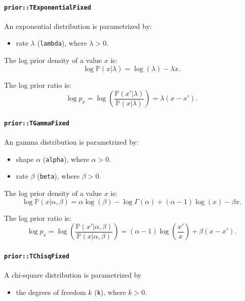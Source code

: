 \documentclass[a4paper,11pt]{article}
\def\p{\mathbb{P}}
\newcommand{\class}[1]{\texttt{#1}}
\newcommand{\privparam}[1]{\texttt{\textunderscore #1}}
\begin{document}
\paragraph{\class{prior::TExponentialFixed}}
An exponential distribution is parametrized by:
\begin{itemize}
 \item rate $\lambda$ (\privparam{lambda}), where $\lambda > 0$.
\end{itemize}

The log prior density of a value $x$ is:
\begin{equation}\label{eq:priorDensExponential}
 \log \p(x|\lambda) = \log(\lambda) - \lambda x.
\end{equation}

The log prior ratio is:
\begin{equation}\label{eq:priorRatioExponential}
 \log p_x = \log \left( \frac{\p(x'|\lambda)}{\p(x|\lambda)} \right) = \lambda (x - x').
\end{equation}

\paragraph{\class{prior::TGammaFixed}}
An gamma distribution is parametrized by:
\begin{itemize}
 \item shape $\alpha$ (\privparam{alpha}), where $\alpha > 0$.
 \item rate $\beta$ (\privparam{beta}), where $\beta > 0$.
\end{itemize}

The log prior density of a value $x$ is:
\begin{equation}\label{eq:priorDensGamma}
 \log \p(x|\alpha, \beta) = \alpha \log(\beta) - \log\Gamma(\alpha) + (\alpha - 1) \log(x) - \beta x.
\end{equation}

The log prior ratio is:
\begin{equation}\label{eq:priorRatioGamma}
 \log p_x = \log \left( \frac{\p(x'|\alpha, \beta)}{\p(x|\alpha, \beta)} \right) = (\alpha - 1) \log\left(\frac{x'}{x}\right) + \beta (x - x').
\end{equation}

\paragraph{\class{prior::TChisqFixed}}
A chi-square distribution is parametrized by
\begin{itemize}
 \item the degrees of freedom $k$ (\privparam{k}), where $k > 0$.
\end{itemize}
\end{document}
